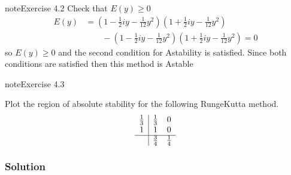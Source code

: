 \documentclass[letterpaper,10pt,english]{jupyterBook}
\begin{document}
\begin{sphinxadmonition}{note}{Exercise 4.2}
\sphinxAtStartPar
Check that \(E(y) \geq 0\)
\begin{align*}
    E(y) &= \left( 1 - \frac{1}{2} i y - \frac{1}{12} y^2 \right)
    \left( 1 + \frac{1}{2} i y - \frac{1}{12} y^2 \right) \\
    & \qquad -
    \left( 1 - \frac{1}{2} i y - \frac{1}{12} y^2 \right)
    \left( 1 + \frac{1}{2} i y - \frac{1}{12} y^2 \right) = 0
\end{align*}
\sphinxAtStartPar
so \(E(y) \geq 0\) and the second condition for A\sphinxhyphen{}stability is satisfied. Since both conditions are satisfied then this method is A\sphinxhyphen{}stable
\end{sphinxadmonition}

\begin{sphinxadmonition}{note}{Exercise 4.3}

\sphinxAtStartPar
Plot the region of absolute stability for the following Runge\sphinxhyphen{}Kutta method.
\begin{align*}
    \begin{array}{c|cc}
        \frac{1}{3} & \frac{1}{3} & 0\\
        1 & 1 & 0\\ \hline
        & \frac{3}{4} & \frac{1}{4}
    \end{array}
\end{align*}\subsubsection*{Solution}


\end{sphinxadmonition}
\end{document}
